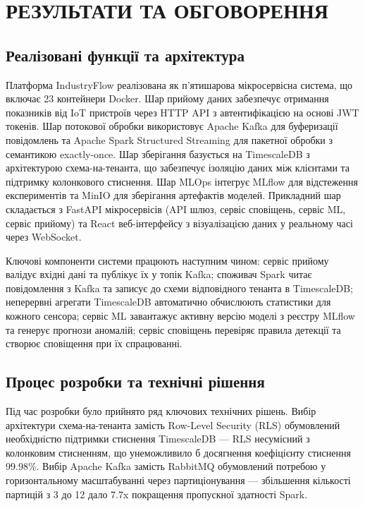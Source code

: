 \chapter{РЕЗУЛЬТАТИ ТА ОБГОВОРЕННЯ}

\section{Реалізовані функції та архітектура}

Платформа IndustryFlow реалізована як п'ятишарова мікросервісна система, що включає 23 контейнери Docker. Шар прийому даних забезпечує отримання показників від IoT пристроїв через HTTP API з автентифікацією на основі JWT токенів. Шар потокової обробки використовує Apache Kafka для буферизації повідомлень та Apache Spark Structured Streaming для пакетної обробки з семантикою exactly-once. Шар зберігання базується на TimescaleDB з архітектурою схема-на-тенанта, що забезпечує ізоляцію даних між клієнтами та підтримку колонкового стиснення. Шар MLOps інтегрує MLflow для відстеження експериментів та MinIO для зберігання артефактів моделей. Прикладний шар складається з FastAPI мікросервісів (API шлюз, сервіс сповіщень, сервіс ML, сервіс прийому) та React веб-інтерфейсу з візуалізацією даних у реальному часі через WebSocket.

Ключові компоненти системи працюють наступним чином: сервіс прийому валідує вхідні дані та публікує їх у топік Kafka; споживач Spark читає повідомлення з Kafka та записує до схеми відповідного тенанта в TimescaleDB; неперервні агрегати TimescaleDB автоматично обчислюють статистики для кожного сенсора; сервіс ML завантажує активну версію моделі з реєстру MLflow та генерує прогнози аномалій; сервіс сповіщень перевіряє правила детекції та створює сповіщення при їх спрацюванні.

\section{Процес розробки та технічні рішення}

Під час розробки було прийнято ряд ключових технічних рішень. Вибір архітектури схема-на-тенанта замість Row-Level Security (RLS) обумовлений необхідністю підтримки стиснення TimescaleDB --- RLS несумісний з колонковим стисненням, що унеможливило б досягнення коефіцієнту стиснення 99.98\%. Вибір Apache Kafka замість RabbitMQ обумовлений потребою у горизонтальному масштабуванні через партиціонування --- збільшення кількості партицій з 3 до 12 дало 7.7x покращення пропускної здатності Spark.

